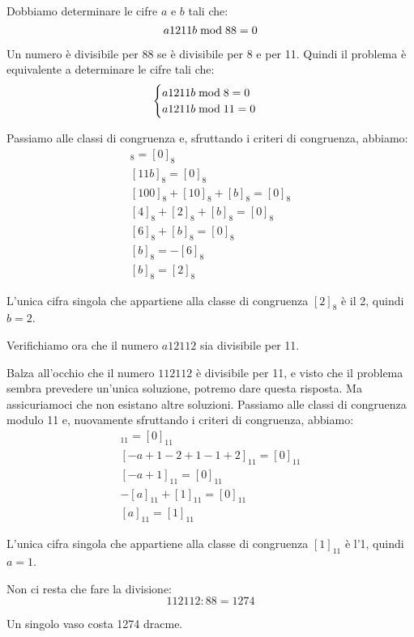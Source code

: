 \begin{soluzione}
    Dobbiamo determinare le cifre $a$ e $b$ tali che:
    \begin{equation*}
        a1211b  \bmod  88 = 0
    \end{equation*}

    Un numero è divisibile per 88 se è divisibile per 8 e per 11.
    Quindi il problema è equivalente a determinare le cifre tali che:
    \begin{equation*}
        \begin{cases}
            a1211b  \bmod  8 = 0 \\
            a1211b  \bmod  11 = 0
        \end{cases}
    \end{equation*}

    Passiamo alle classi di congruenza e, sfruttando i criteri di congruenza, abbiamo:
    \begin{gather*}
        [a1211b]_8 = [0]_8 \\
        [11b]_8 = [0]_8 \\
        [100]_8 + [10]_8 + [b]_8 = [0]_8 \\
        [4]_8 + [2]_8 + [b]_8 = [0]_8 \\
        [6]_8 + [b]_8 = [0]_8 \\
        [b]_8 = -[6]_8 \\
        [b]_8 = [2]_8
    \end{gather*}

    L'unica cifra singola che appartiene alla classe di congruenza $[2]_8$ è il 2, quindi $b = 2$.

    Verifichiamo ora che il numero $a12112$ sia divisibile per 11.

    Balza all'occhio che il numero $112112$ è divisibile per 11, e visto che il problema sembra prevedere un'unica
    soluzione, potremo dare questa risposta.
    Ma assicuriamoci che non esistano altre soluzioni.
    Passiamo alle classi di congruenza modulo 11 e, nuovamente sfruttando i criteri di congruenza, abbiamo:
    \begin{gather*}
        [a12112]_{11} = [0]_{11} \\
        [-a + 1 - 2 + 1 - 1 + 2]_{11} = [0]_{11} \\
        [-a + 1]_{11} = [0]_{11} \\
        -[a]_{11} + [1]_{11} = [0]_{11} \\
        [a]_{11} = [1]_{11}
    \end{gather*}

    L'unica cifra singola che appartiene alla classe di congruenza $[1]_{11}$ è l'1, quindi $a = 1$.

    Non ci resta che fare la divisione:
    \begin{equation*}
        112112 : 88 = 1274
    \end{equation*}

    Un singolo vaso costa 1274 dracme.
\end{soluzione}

